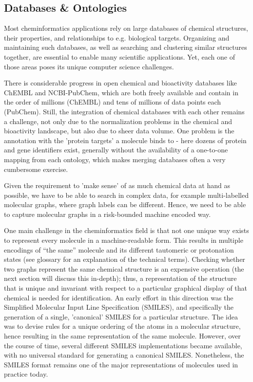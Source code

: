 \documentclass{sig-alternate}
\begin{document}
\subsection{Databases \& Ontologies}
\label{sec:databases}


Most cheminformatics applications rely on large databases of chemical structures, 
their properties, and relationships to e.g. biological targets.
Organizing and maintaining such databases, as well as searching and clustering similar structures together,
are essential  to enable many scientific applications. Yet, each one of
those areas poses its unique computer science challenges.

There is considerable progress in open chemical and bioactivity databases like
ChEMBL and NCBI-PubChem, which are both freely available and contain in the order of millions (ChEMBL) and tens of millions of data points each (PubChem). Still, the integration
of chemical databases with each other remains a challenge, not only due to the
normalization problems in the chemical and bioactivity landscape, but also due
to sheer data volume. One problem is the annotation with the 'protein targets' a molecule binds to - here dozens of protein and gene identifiers exist, generally without the availability of a one-to-one mapping from each ontology, which makes merging databases often a very cumbersome exercise.

Given the requirement to 'make sense' of as much chemical data at hand as possible, we have to be able to search in complex data, for example multi-labelled molecular graphs, where graph labels can be different. Hence, we need to be able to capture
molecular graphs in a risk-bounded machine encoded way. 

One main challenge in the cheminformatics field is that not one unique way exists to represent every molecule in a machine-readable form. This results in multiple encodings of
``the same'' molecule and its different tautomeric or protonation states (see glossary for an explanation of the technical terms). Checking whether two graphs represent the same chemical structure is
an expensive operation (the next section will discuss this in-depth);
thus, a representation of the structure that is unique and invariant
with respect to a particular graphical display of that chemical is needed for
identification. An early effort in this direction was the Simplified
Molecular Input Line Specification (SMILES), and specifically the
generation of a single, 'canonical' SMILES for a particular structure. The idea was to devise rules for a unique ordering of the atoms in a molecular structure, hence resulting in the same representation of the same molecule. However,
over the course of time, several
different SMILES implementations became available, with no universal
standard for generating a canonical SMILES. Nonetheless, the SMILES format remains one of the major representations of molecules used in practice today.
\end{document}
